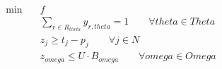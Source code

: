\begin{align}
  \min\quad & f \tag{eq\_0003} \\
  & \sum_{r \in R_{theta}} y_{r,theta} = 1 \qquad \forall theta \in Theta \tag{eq\_0004} \\
  & z_{j} \ge t_{j} - p_{j} \qquad \forall j \in N \tag{eq\_0005} \\
  & z_{omega} \le U \cdot B_{omega} \qquad \forall omega \in Omega \tag{eq\_0010} \\
\end{align}
